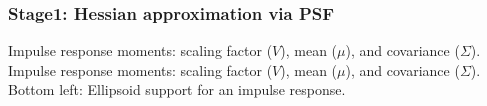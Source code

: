 \documentclass[10pt,final,xcolor=dvipsnames]{beamer}
\newcommand{\spatialmean}{\mu}
\begin{document}
\begin{frame}
  \frametitle{Stage1: Hessian approximation via PSF}

  \def \pos {0.5\columnwidth}
  \begin{figure}[ht]\centering
  \end{figure}

  \begin{center}
     {Impulse response moments: scaling factor ($V$), mean
    ($\mu$), and covariance ($\Sigma$).}
     {Impulse response moments: scaling factor ($V$), mean
    ($\mu$), and covariance ($\Sigma$). Bottom left: Ellipsoid support
    for an impulse response.}
  \end{center}
\end{frame}
\end{document}
